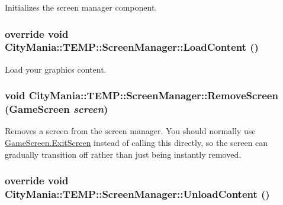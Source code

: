 Initializes the screen manager component. \hypertarget{classCityMania_1_1TEMP_1_1ScreenManager_a0adf33efb7ec6a3aece591d7dc8d01b4}{
\subsubsection[{LoadContent}]{\setlength{\rightskip}{0pt plus 5cm}override void CityMania::TEMP::ScreenManager::LoadContent ()}}
\label{classCityMania_1_1TEMP_1_1ScreenManager_a0adf33efb7ec6a3aece591d7dc8d01b4}


Load your graphics content. \hypertarget{classCityMania_1_1TEMP_1_1ScreenManager_a89569f0a358ed32c83beed2913194a88}{
\subsubsection[{RemoveScreen}]{\setlength{\rightskip}{0pt plus 5cm}void CityMania::TEMP::ScreenManager::RemoveScreen ({\bf GameScreen} {\em screen})}}
\label{classCityMania_1_1TEMP_1_1ScreenManager_a89569f0a358ed32c83beed2913194a88}


Removes a screen from the screen manager. You should normally use \hyperlink{classCityMania_1_1GameScreen_ada4a6b75da175b4286662d888eefc3e2}{GameScreen.ExitScreen} instead of calling this directly, so the screen can gradually transition off rather than just being instantly removed. \hypertarget{classCityMania_1_1TEMP_1_1ScreenManager_a6054a8c276fd02a31500a0d2ecf05da2}{
\subsubsection[{UnloadContent}]{\setlength{\rightskip}{0pt plus 5cm}override void CityMania::TEMP::ScreenManager::UnloadContent ()}}
\label{classCityMania_1_1TEMP_1_1ScreenManager_a6054a8c276fd02a31500a0d2ecf05da2}


